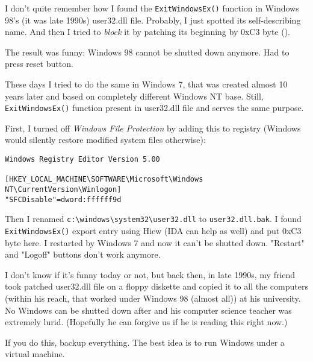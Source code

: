 
I don't quite remember how I found the \verb|ExitWindowsEx()| function in Windows 98's (it was late 1990s) user32.dll file.
Probably, I just spotted its self-describing name.
And then I tried to \emph{block} it by patching its beginning by 0xC3 byte ().

The result was funny: Windows 98 cannot be shutted down anymore.
Had to press reset button.

These days I tried to do the same in Windows 7, that was created almost 10 years later and based on completely different Windows NT
base.
Still, \verb|ExitWindowsEx()| function present in user32.dll file and serves the same purpose.

First, I turned off \emph{Windows File Protection} by adding this to registry
(Windows would silently restore modified system files otherwise):

\begin{lstlisting}
Windows Registry Editor Version 5.00

[HKEY_LOCAL_MACHINE\SOFTWARE\Microsoft\Windows NT\CurrentVersion\Winlogon]
"SFCDisable"=dword:ffffff9d
\end{lstlisting}

Then I renamed \verb|c:\windows\system32\user32.dll| to \verb|user32.dll.bak|.
I found \verb|ExitWindowsEx()| export entry using Hiew (IDA can help as well) and put 0xC3 byte here.
I restarted by Windows 7 and now it can't be shutted down.
"Restart" and "Logoff" buttons don't work anymore.

I don't know if it's funny today or not, but back then, in late 1990s, my friend took patched user32.dll file
on a floppy diskette and copied it to all the computers
(within his reach, that worked under Windows 98 (almost all))
at his university.
No Windows can be shutted down after and his computer science teacher was extremely lurid.
(Hopefully he can forgive us if he is reading this right now.)

If you do this, backup everything.
The best idea is to run Windows under a virtual machine.


